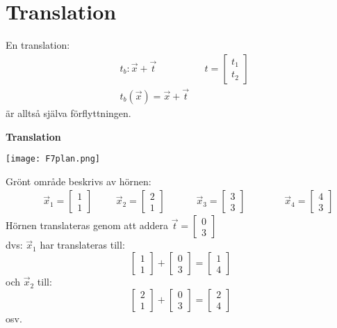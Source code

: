 \section{Translation} %
\label{sec:translation}
En translation:
\begin{align*}
&t_b:\vec{x} + \vec{t} &&t=\begin{bmatrix} t_1\\t_2 \end{bmatrix}\\
&t_b(\vec{x}) = \vec{x} + \vec{t}
\end{align*}
är alltså själva förflyttningen.
\begin{Ex}
\textbf{Translation}
	\begin{center}
		\texttt{[image: F7plan.png]}
	\end{center}
    Grönt område beskrivs av hörnen:
    \begin{align*}
    &&\vec{x}_1 = \begin{bmatrix} 1\\1 \end{bmatrix}
    &&&\vec{x}_2 = \begin{bmatrix} 2\\1 \end{bmatrix}
    &&&&\vec{x}_3 = \begin{bmatrix} 3\\3 \end{bmatrix}
    &&&&&\vec{x}_4 = \begin{bmatrix} 4\\3 \end{bmatrix}
    \end{align*}
    Hörnen translateras genom att addera $\vec{t} = \begin{bmatrix} 0\\3 \end{bmatrix}$\\
    dvs: $\vec{x}_1$ har translateras till:
    \[
        \begin{bmatrix} 1\\1 \end{bmatrix} + \begin{bmatrix} 0\\3 \end{bmatrix} = \begin{bmatrix} 1\\4 \end{bmatrix}
    \]
    och $\vec{x}_2$ till:
    \[
        \begin{bmatrix} 2\\1 \end{bmatrix} + \begin{bmatrix} 0\\3 \end{bmatrix} = \begin{bmatrix} 2\\4 \end{bmatrix}
    \]
    osv.
\end{Ex}

